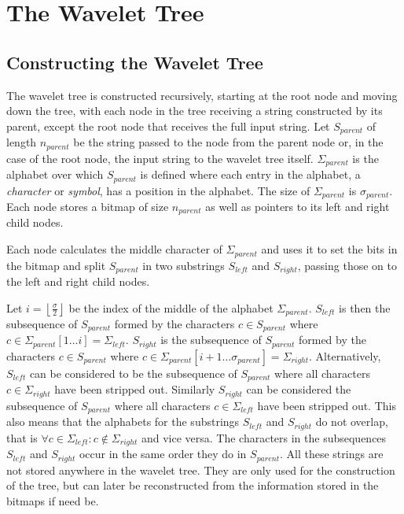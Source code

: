 \section{The Wavelet Tree}


\subsection{Constructing the Wavelet Tree}
\label{sec:nodeconstruction}
The wavelet tree is constructed recursively, starting at the root node and moving down the tree, with each node in the tree receiving a string constructed by its parent, except the root node that receives the full input string.
Let $S_{\mathit{parent}}$ of length $n_{\mathit{parent}}$ be the string passed to the node from the parent node or, in the case of the root node, the input string to the wavelet tree itself.
$\Sigma_{\mathit{parent}}$ is the alphabet over which $S_{\mathit{parent}}$ is defined where each entry in the alphabet, a \textit{character} or \textit{symbol}, has a position in the alphabet.
The size of $\Sigma_{\mathit{parent}}$ is $\sigma_{\mathit{parent}}$.
Each node stores a bitmap of size $n_{\mathit{parent}}$ as well as pointers to its left and right child nodes.

Each node calculates the middle character of $\Sigma_{\mathit{parent}}$ and uses it to set the bits in the bitmap and split $S_{\mathit{parent}}$ in two substrings $S_{\mathit{left}}$ and $S_{\mathit{right}}$, passing those on to the left and right child nodes.

Let $i = \left\lfloor\frac{\sigma}{2}\right\rfloor$ be the index of the middle of the alphabet $\Sigma_{\mathit{parent}}$.
$S_{\mathit{left}}$ is then the subsequence of $S_{\mathit{parent}}$ formed by the characters $c \in S_{\mathit{parent}}$ where $c \in \Sigma_{\mathit{parent}}[1 \ldots i] = \Sigma_{\mathit{left}}$.
$S_{\mathit{right}}$ is the subsequence of $S_{\mathit{parent}}$ formed by the characters $c \in S_{\mathit{parent}}$ where $c \in \Sigma_{\mathit{parent}}[i+1 \ldots \sigma_{\mathit{parent}}] = \Sigma_{\mathit{right}}$.
Alternatively, $S_{\mathit{left}}$ can be considered to be the subsequence of $S_{\mathit{parent}}$ where all characters $c \in \Sigma_{\mathit{right}}$ have been stripped out. Similarly $S_{\mathit{right}}$ can be considered the subsequence of $S_{\mathit{parent}}$ where all characters $c \in \Sigma_{\mathit{left}}$ have been stripped out.
This also means that the alphabets for the substrings $S_{\mathit{left}}$ and $S_{\mathit{right}}$ do not overlap, that is $\forall c \in \Sigma_{\mathit{left}}: c \notin \Sigma_{\mathit{right}}$ and vice versa.
The characters in the subsequences $S_{\mathit{left}}$ and $S_{\mathit{right}}$ occur in the same order they do in $S_{\mathit{parent}}$.
All these strings are not stored anywhere in the wavelet tree.
They are only used for the construction of the tree, but can later be reconstructed from the information stored in the bitmaps if need be.

